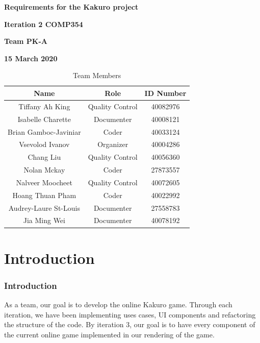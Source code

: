 \documentclass[12pt]{article}
\begin{document}
\vspace*{0.5in}
\centerline{\bf\Large
Requirements for the Kakuro project}


\vspace*{0.5in}
\centerline{\bf\Large Iteration 2 COMP354}

\vspace*{0.5in}
\centerline{\bf\Large Team PK-A}

\vspace*{0.5in}
\centerline{\bf\Large 15 March 2020}

\vspace*{1.5in}
\begin{table}[htbp]
\caption{Team Members}
\begin{center}
\begin{tabular}{|c |c | c|}
\hline
Name & Role & ID Number \\
\hline\hline
Tiffany Ah King & Quality Control & 40082976 \\
\hline
Isabelle Charette & Documenter & 40008121 \\
\hline
Brian Gamboc-Javiniar & Coder & 40033124 \\
\hline
Vsevolod Ivanov & Organizer & 40004286 \\
\hline
Chang Liu & Quality Control & 40056360 \\
\hline
Nolan Mckay & Coder & 27873557 \\
\hline
Nalveer Moocheet & Quality Control & 40072605 \\
\hline
Hoang Thuan Pham & Coder & 40022992 \\
\hline
Audrey-Laure St-Louis & Documenter & 27558783 \\
\hline
Jia Ming Wei & Documenter & 40078192 \\
\hline
\end{tabular}
\end{center}
\end{table}


\newpage

\renewcommand*\contentsname{Table of Contents}

\tableofcontents

\clearpage

\section{Introduction}
\subsubsection{Introduction}
As a team, our goal is to develop the online Kakuro game. Through each iteration, we have been implementing uses cases, UI components and refactoring the structure of the code. By iteration 3, our goal is to have every component of the current online game implemented in our rendering of the game. 
\end{document}

